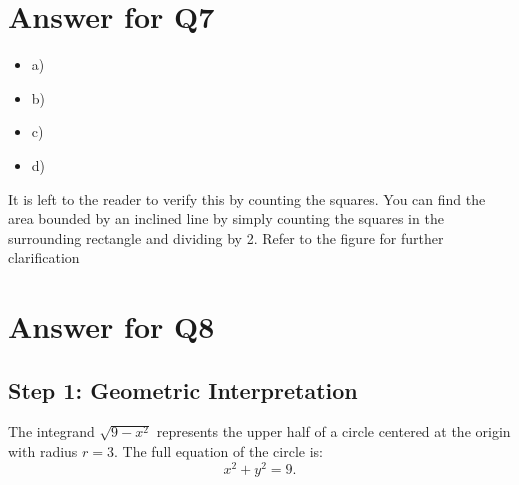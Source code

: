 \documentclass{article}
\begin{document}
\section*{Answer for Q7}
\begin{itemize}
    \item a) \\
    \item b) \\
    \item c) \\
    \item d) 
\end{itemize}
It is left to the reader to verify this by counting the squares. You can find the area bounded by an inclined line by simply counting the squares in the surrounding rectangle and dividing by 2. Refer to the figure for further clarification\\
\begin{center}
\end{center}
\section*{Answer for Q8}
\subsection*{Step 1: Geometric Interpretation}
The integrand \(\sqrt{9 - x^2}\) represents the upper half of a circle centered at the origin with radius \(r = 3\). The full equation of the circle is:
\[
x^2 + y^2 = 9.
\]
\end{document}
